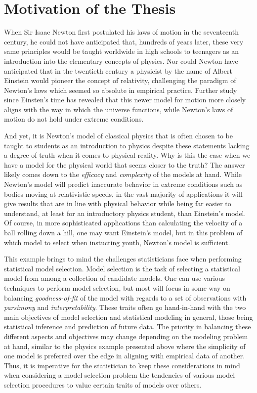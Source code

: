 \doublespace
{}
		\section{Motivation of the Thesis}
		When Sir Isaac Newton first postulated his laws of motion in the seventeenth century, he could not have anticipated that, hundreds of years later, these very same principles would
		be taught worldwide in high schools to teenagers as an introduction into the elementary concepts of physics. Nor could Newton have anticipated that in the twentieth century a
		physicist by the name of Albert Einstein would pioneer the concept of relativity, challenging the paradigm of Newton's laws which seemed so absolute in empirical practice. Further study
		since Einsten's time has revealed that this newer model for motion more closely aligns with the way in which the universe functions, while Newton's laws of motion do not hold
		under extreme conditions.

		And yet, it is Newton's model of classical physics that is often chosen to be taught to students as an introduction to physics despite these statements lacking a degree of truth when
		it comes to physical reality. Why is this the case when we have a model for the physical world that seems closer to the truth? The answer likely comes down to the \textit{efficacy} and
		\textit{complexity} of the models at hand. While Newton's model will predict inaccurate behavior in extreme conditions such as bodies moving at relativistic speeds, in the
		vast majority of applications it will give results that are in line with physical behavior while being far easier to understand, at least for an introductory physics student, than 
		Einstein's model. Of course, in more sophisticated applications than calculating the velocity of a ball rolling down a hill, one may want Einstein's model, but in this problem of 
		which model to select when instucting youth, Newton's model is sufficient.

		This example brings to mind the challenges statisticians face when performing statistical model selection. Model selection is the task of selecting a statistical model from among a
		collection of candidate models. One can use various techniques to perform model selection, but most will focus in some way on balancing \textit{goodness-of-fit} of the model with
		regards to a set of observations with \textit{parsimony} and \textit{interpretability}. These traits often go hand-in-hand with the two main objectives of model selection and 
		statistical modeling in general, those being statistical inference and prediction of future data. The priority in balancing these different aspects and objectives may change depending
		on the modeling problem at hand, similar to the physics example presented above where the simplicity of one model is preferred over the edge in aligning with empirical data of another.
		Thus, it is imperative for the statistician to keep these considerations in mind when considering a model selection problem the tendencies of various model selection procedures to value certain
		traits of models over others.


